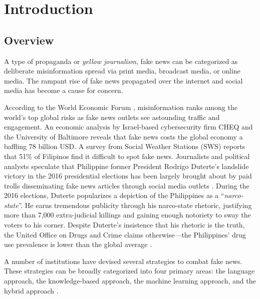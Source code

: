 \chapter{Introduction}
\label{sec:researchdesc}    %

\section{Overview}
\label{sec:overview}

A type of propaganda or \textit{yellow journalism}, fake news \cite{nyt-trump-lies} can be categorized as deliberate misinformation spread via print media, broadcast media, or online media. The rampant rise of fake news propagated over the internet and social media has become a cause for concern.

According to the World Economic Forum \cite{weforum-report}, misinformation ranks among the world's top global risks as fake news outlets see astounding traffic and engagement. An economic analysis by Israel-based cybersecurity firm CHEQ and the University of Baltimore \cite{pids-report} reveals that fake news costs the global economy a baffling 78 billion USD. A survey from Social Weather Stations (SWS) \cite{juan-felix-et-al-2023} reports that 51\% of Filipinos find it difficult to spot fake news. Journalists and political analysts speculate that Philippine former President Rodrigo Duterte's landslide victory in the 2016 presidential elections has been largely brought about by paid trolls disseminating fake news articles through social media outlets \cite{harvard-cyber-report}. During the 2016 elections, Duterte popularizes a depiction of the Philippines as a \enquote{\textit{narco-state}}\cite{demick2016duterte}. He earns tremendous publicity through his narco-state rhetoric, justifying more than 7,000 extra-judicial killings \cite{alconaba2016digong} and gaining enough notoriety to sway the voters to his corner. Despite Duterte's insistence that his rhetoric is the truth, the United Office on Drugs and Crime claims otherwise—the Philippines' drug use prevalence is lower than the global average \cite{yee2017posttruth}.

A number of institutions have devised several strategies to combat fake news. These strategies can be broadly categorized into four primary areas: the language approach, the knowledge-based approach, the machine learning approach, and the hybrid approach \cite{debeer2020approaches}.

